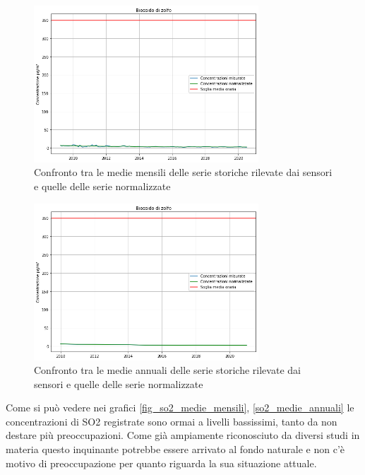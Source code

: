 \documentclass[a4paper,12pt]{report}
\begin{document}
\begin{figure}[h]
\centering
\includegraphics[width=0.75\textwidth]{so2_medie_mensili}
\caption{Confronto tra le medie mensili delle serie storiche rilevate dai sensori e quelle delle serie normalizzate}
\label{fig:so2_medie_mensili}
\end{figure}

\begin{figure}[h]
\centering
\includegraphics[width=0.75\textwidth]{so2_medie_annuali}
\caption{Confronto tra le medie annuali delle serie storiche rilevate dai sensori e quelle delle serie normalizzate}
\label{fig:so2_medie_annuali}
\end{figure}

Come si può vedere nei grafici \ref{fig_so2_medie_mensili}, \ref{so2_medie_annuali} le concentrazioni di SO2 registrate sono ormai a livelli bassissimi, tanto da non destare più preoccupazioni. Come già ampiamente riconosciuto da diversi studi in materia \cite{iir2020, scolari2017evoluzione}
 questo inquinante potrebbe essere arrivato al fondo naturale e non c'è motivo di preoccupazione per quanto riguarda la sua situazione attuale.
\end{document}

